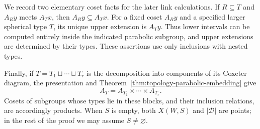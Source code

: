 We record two elementary coset facts for the later link calculations.
If $R\subseteq T$ and $A_Ry$ meets $A_Tx$, then
$A_Ry\subseteq A_Tx$.  For a fixed coset $A_Ry$ and a specified
larger spherical type $T$, its unique upper extension is $A_Ty$.
Thus lower intervals can be computed entirely inside the indicated
parabolic subgroup, and upper extensions are determined by their
types.  These assertions use only inclusions with nested types.

Finally, if $T=T_1\sqcup\cdots\sqcup T_r$ is the decomposition into
components of its Coxeter diagram, the presentation and
Theorem~\ref{thm:topology-parabolic-embedding} give
\begin{equation}
  A_T=A_{T_1}\times\cdots\times A_{T_r}.
  \label{eq:topology-parabolic-product}
\end{equation}
Cosets of subgroups whose types lie in these blocks, and their
inclusion relations, are accordingly products.  When $S$ is empty,
both $X(W,S)$ and $|\mathcal D|$ are points; in the rest of the proof
we may assume $S\ne\varnothing$.
